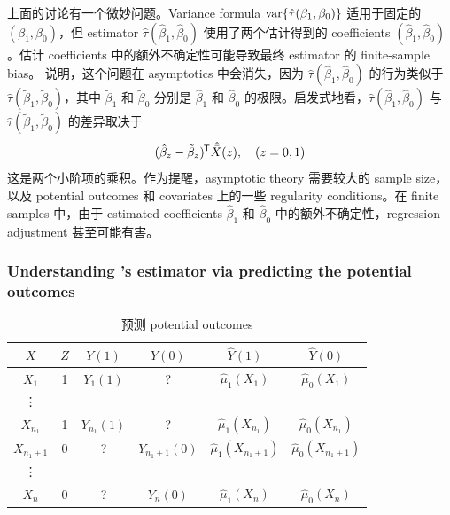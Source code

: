 上面的讨论有一个微妙问题。Variance formula $\textup{var}\{ \hat{\tau}(\beta_1, \beta_0) \} $ 适用于固定的 $(\beta_1, \beta_0)$，但 estimator $ \hat{\tau}( \hat{\beta}_1, \hat{\beta}_0) $ 使用了两个估计得到的 coefficients $( \hat{\beta}_1, \hat{\beta}_0) $。估计 coefficients 中的额外不确定性可能导致最终 estimator 的 finite-sample bias。\citet{lin2013} 说明，这个问题在 asymptotics 中会消失，因为 $ \hat{\tau}( \hat{\beta}_1, \hat{\beta}_0) $ 的行为类似于 $ \hat{\tau}( \tilde{\beta}_1, \tilde{\beta}_0) $，其中 $\tilde{\beta}_1$ 和 $\tilde{\beta}_0$ 分别是 $\hat{\beta}_1$ 和 $ \hat{\beta}_0$ 的极限。启发式地看，$ \hat{\tau}( \hat{\beta}_1, \hat{\beta}_0) $ 与 $ \hat{\tau}( \tilde{\beta}_1, \tilde{\beta}_0) $ 的差异取决于
$$
(\hat{\beta}_z - \tilde{\beta}_z)^{\mkern-1.5mu\mathsf{T}} \hat{\bar{X} }(z) ,\quad (z=0,1) 
$$
这是两个小阶项的乘积。作为提醒，asymptotic theory 需要较大的 sample size，以及 potential outcomes 和 covariates 上的一些 regularity conditions。在 finite samples 中，由于 estimated coefficients $\hat{\beta}_1$ 和 $\hat{\beta}_0$ 中的额外不确定性，regression adjustment 甚至可能有害。

\subsubsection{Understanding \citet{lin2013}'s estimator via predicting the potential outcomes}
\label{sec::understand-lin-predict}
 
\begin{table}
\centering
\caption{预测 potential outcomes}\label{tb::predict-po-ols}
\begin{tabular}{cccccc}
\hline 
$X$ & $Z$ & $Y(1)$ & $Y(0)$ &  $\hat{Y}(1)$ & $\hat{Y}(0)$ \\
\hline
$X_1 $ & 1 & $Y_1(1)$ & ? & $\hat{\mu}_1(X_1 )$ & $\hat{\mu}_0(X_1)$ \\
\vdots \\
$X_{n_1}$ & 1 & $Y_{n_1}(1)$ & ? & $\hat{\mu}_1(X_{n_1})$ & $\hat{\mu}_0(X_{n_1})$ \\
$X_{n_1 + 1}$ & 0 & ? & $Y_{n_1+1}(0)$ & $\hat{\mu}_1(X_{n_1+1})$ & $\hat{\mu}_0(X_{n_1+1})$ \\
\vdots \\
$X_{n}$ & 0 & ? & $Y_{n}(0)$ & $\hat{\mu}_1(X_{n})$ & $\hat{\mu}_0(X_{n})$ \\
\hline 
\end{tabular}
\end{table}

